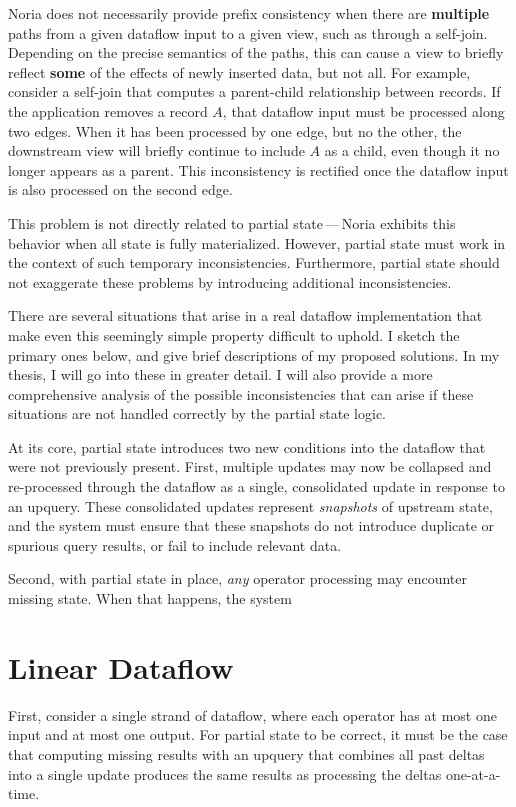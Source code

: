 Noria does not necessarily provide prefix consistency when there are
\textbf{multiple} paths from a given dataflow input to a given view, such as
through a self-join. Depending on the precise semantics of the paths, this can
cause a view to briefly reflect \textbf{some} of the effects of newly inserted
data, but not all. For example, consider a self-join that computes a
parent-child relationship between records. If the application removes a record
$A$, that dataflow input must be processed along two edges. When it has been
processed by one edge, but no the other, the downstream view will briefly
continue to include $A$ as a child, even though it no longer appears as a
parent. This inconsistency is rectified once the dataflow input is also
processed on the second edge.

This problem is not directly related to partial state\,---\,Noria exhibits this
behavior when all state is fully materialized. However, partial state must work
in the context of such temporary inconsistencies. Furthermore, partial state
should not exaggerate these problems by introducing additional inconsistencies.

There are several situations that arise in a real dataflow implementation that
make even this seemingly simple property difficult to uphold. I sketch the
primary ones below, and give brief descriptions of my proposed solutions. In my
thesis, I will go into these in greater detail. I will also provide a more
comprehensive analysis of the possible inconsistencies that can arise if these
situations are not handled correctly by the partial state logic.

At its core, partial state introduces two new conditions into the dataflow that
were not previously present. First, multiple updates may now be collapsed and
re-processed through the dataflow as a single, consolidated update in response
to an upquery. These consolidated updates represent \textit{snapshots} of
upstream state, and the system must ensure that these snapshots do not introduce
duplicate or spurious query results, or fail to include relevant data.

Second, with partial state in place, \emph{any} operator processing may
encounter missing state. When that happens, the system

\section{Linear Dataflow}

First, consider a single strand of dataflow, where each operator has at most one
input and at most one output. For partial state to be correct, it must be the
case that computing missing results with an upquery that combines all past
deltas into a single update produces the same results as processing the deltas
one-at-a-time.

